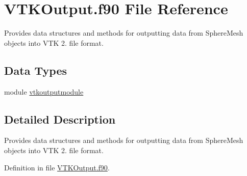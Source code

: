 \hypertarget{VTKOutput_8f90}{\section{V\+T\+K\+Output.\+f90 File Reference}
\label{VTKOutput_8f90}
}


Provides data structures and methods for outputting data from Sphere\+Mesh objects into V\+T\+K 2. file format.  


\subsection*{Data Types}
\begin{DoxyCompactItemize}
\item 
module \hyperlink{classvtkoutputmodule}{vtkoutputmodule}
\end{DoxyCompactItemize}


\subsection{Detailed Description}
Provides data structures and methods for outputting data from Sphere\+Mesh objects into V\+T\+K 2. file format. 



Definition in file \hyperlink{VTKOutput_8f90_source}{V\+T\+K\+Output.\+f90}.

